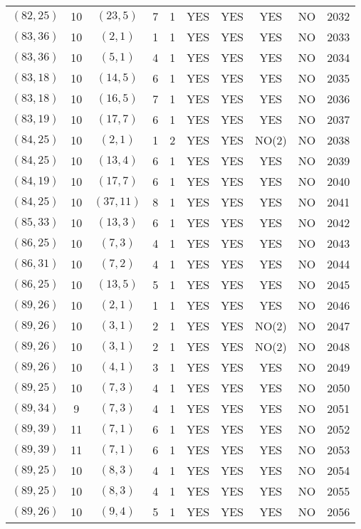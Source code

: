 \begin{longtable}{|c|c|c|c|c|c|c|c|c|c|}
$(82, 25)$ & 10 & $(23, 5)$ & 7 & 1 & YES & YES & YES & NO & 2032\\
$(83, 36)$ & 10 & $(2, 1)$ & 1 & 1 & YES & YES & YES & NO & 2033\\
$(83, 36)$ & 10 & $(5, 1)$ & 4 & 1 & YES & YES & YES & NO & 2034\\
$(83, 18)$ & 10 & $(14, 5)$ & 6 & 1 & YES & YES & YES & NO & 2035\\
$(83, 18)$ & 10 & $(16, 5)$ & 7 & 1 & YES & YES & YES & NO & 2036\\
$(83, 19)$ & 10 & $(17, 7)$ & 6 & 1 & YES & YES & YES & NO & 2037\\
$(84, 25)$ & 10 & $(2, 1)$ & 1 & 2 & YES & YES & NO(2) & NO & 2038\\
$(84, 25)$ & 10 & $(13, 4)$ & 6 & 1 & YES & YES & YES & NO & 2039\\
$(84, 19)$ & 10 & $(17, 7)$ & 6 & 1 & YES & YES & YES & NO & 2040\\
$(84, 25)$ & 10 & $(37, 11)$ & 8 & 1 & YES & YES & YES & NO & 2041\\
$(85, 33)$ & 10 & $(13, 3)$ & 6 & 1 & YES & YES & YES & NO & 2042\\
$(86, 25)$ & 10 & $(7, 3)$ & 4 & 1 & YES & YES & YES & NO & 2043\\
$(86, 31)$ & 10 & $(7, 2)$ & 4 & 1 & YES & YES & YES & NO & 2044\\
$(86, 25)$ & 10 & $(13, 5)$ & 5 & 1 & YES & YES & YES & NO & 2045\\
$(89, 26)$ & 10 & $(2, 1)$ & 1 & 1 & YES & YES & YES & NO & 2046\\
$(89, 26)$ & 10 & $(3, 1)$ & 2 & 1 & YES & YES & NO(2) & NO & 2047\\
$(89, 26)$ & 10 & $(3, 1)$ & 2 & 1 & YES & YES & NO(2) & NO & 2048\\
$(89, 26)$ & 10 & $(4, 1)$ & 3 & 1 & YES & YES & YES & NO & 2049\\
$(89, 25)$ & 10 & $(7, 3)$ & 4 & 1 & YES & YES & YES & NO & 2050\\
$(89, 34)$ & 9 & $(7, 3)$ & 4 & 1 & YES & YES & YES & NO & 2051\\
$(89, 39)$ & 11 & $(7, 1)$ & 6 & 1 & YES & YES & YES & NO & 2052\\
$(89, 39)$ & 11 & $(7, 1)$ & 6 & 1 & YES & YES & YES & NO & 2053\\
$(89, 25)$ & 10 & $(8, 3)$ & 4 & 1 & YES & YES & YES & NO & 2054\\
$(89, 25)$ & 10 & $(8, 3)$ & 4 & 1 & YES & YES & YES & NO & 2055\\
$(89, 26)$ & 10 & $(9, 4)$ & 5 & 1 & YES & YES & YES & NO & 2056\\

\end{longtable}
